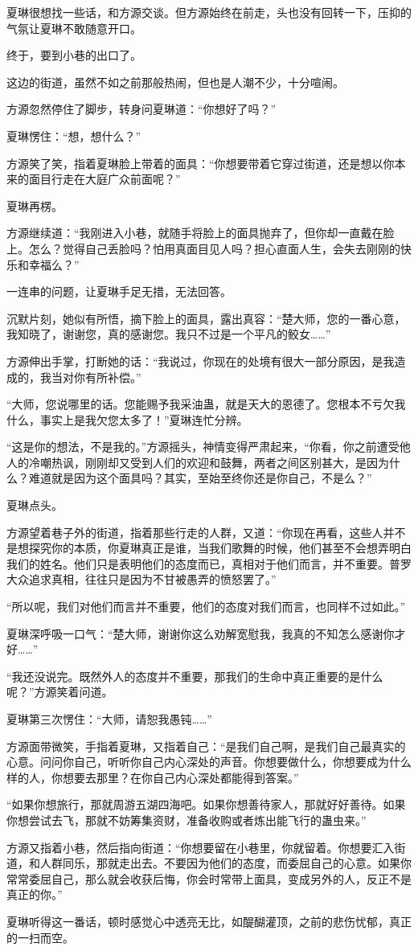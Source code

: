 \begin{this_body}
夏琳很想找一些话，和方源交谈。但方源始终在前走，头也没有回转一下，压抑的气氛让夏琳不敢随意开口。

终于，要到小巷的出口了。

这边的街道，虽然不如之前那般热闹，但也是人潮不少，十分喧闹。

方源忽然停住了脚步，转身问夏琳道：“你想好了吗？”

夏琳愣住：“想，想什么？”

方源笑了笑，指着夏琳脸上带着的面具：“你想要带着它穿过街道，还是想以你本来的面目行走在大庭广众前面呢？”

夏琳再楞。

方源继续道：“我刚进入小巷，就随手将脸上的面具抛弃了，但你却一直戴在脸上。怎么？觉得自己丢脸吗？怕用真面目见人吗？担心直面人生，会失去刚刚的快乐和幸福么？”

一连串的问题，让夏琳手足无措，无法回答。

沉默片刻，她似有所悟，摘下脸上的面具，露出真容：“楚大师，您的一番心意，我知晓了，谢谢您，真的感谢您。我只不过是一个平凡的鲛女……”

方源伸出手掌，打断她的话：“我说过，你现在的处境有很大一部分原因，是我造成的，我当对你有所补偿。”

“大师，您说哪里的话。您能赐予我采油蛊，就是天大的恩德了。您根本不亏欠我什么，事实上是我欠您太多了！”夏琳连忙分辨。

“这是你的想法，不是我的。”方源摇头，神情变得严肃起来，“你看，你之前遭受他人的冷嘲热讽，刚刚却又受到人们的欢迎和鼓舞，两者之间区别甚大，是因为什么？难道就是因为这个面具吗？其实，至始至终你还是你自己，不是么？”

夏琳点头。

方源望着巷子外的街道，指着那些行走的人群，又道：“你现在再看，这些人并不是想探究你的本质，你夏琳真正是谁，当我们歌舞的时候，他们甚至不会想弄明白我们的姓名。他们只是表明他们的态度而已，真相对于他们而言，并不重要。普罗大众追求真相，往往只是因为不甘被愚弄的愤怒罢了。”

“所以呢，我们对他们而言并不重要，他们的态度对我们而言，也同样不过如此。”

夏琳深呼吸一口气：“楚大师，谢谢你这么劝解宽慰我，我真的不知怎么感谢你才好……”

“我还没说完。既然外人的态度并不重要，那我们的生命中真正重要的是什么呢？”方源笑着问道。

夏琳第三次愣住：“大师，请恕我愚钝……”

方源面带微笑，手指着夏琳，又指着自己：“是我们自己啊，是我们自己最真实的心意。问问你自己，听听你自己内心深处的声音。你想要做什么，你想要成为什么样的人，你想要去那里？在你自己内心深处都能得到答案。”

“如果你想旅行，那就周游五湖四海吧。如果你想善待家人，那就好好善待。如果你想尝试去飞，那就不妨筹集资财，准备收购或者炼出能飞行的蛊虫来。”

方源又指着小巷，然后指向街道：“你想要留在小巷里，你就留着。你想要汇入街道，和人群同乐，那就走出去。不要因为他们的态度，而委屈自己的心意。如果你常常委屈自己，那么就会收获后悔，你会时常带上面具，变成另外的人，反正不是真正的你。”

夏琳听得这一番话，顿时感觉心中透亮无比，如醍醐灌顶，之前的悲伤忧郁，真正的一扫而空。

\end{this_body}


